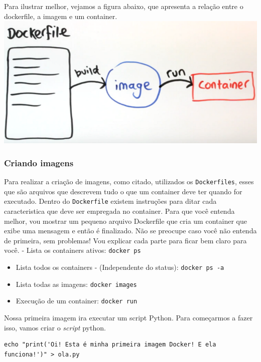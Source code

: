 \documentclass[]{article}
\begin{document}
Para ilustrar melhor, vejamos a figura abaixo, que apresenta a relação entre o dockerfile, a imagem e um container.
\includegraphics{res/docker_file_image_container.png}

\hypertarget{criando-imagens}{%
\subsubsection{Criando imagens}\label{criando-imagens}}

Para realizar a criação de imagens, como citado, utilizados os \texttt{Dockerfiles}, esses que são arquivos que descrevem tudo o que um container deve ter quando for executado. Dentro do \texttt{Dockerfile} existem instruções para ditar cada caracteristica que deve ser empregada no container. Para que você entenda melhor, vou mostrar um pequeno arquivo Dockerfile que cria um container que exibe uma mensagem e então é finalizado. Não se preocupe caso você não entenda de primeira, sem problemas! Vou explicar cada parte para ficar bem claro para você.
- Lista os containers ativos: \texttt{docker\ ps}

\begin{itemize}
\item
  Lista todos os containers - (Independente do status): \texttt{docker\ ps\ -a}
\item
  Lista todas as imagens: \texttt{docker\ images}
\item
  Execução de um container: \texttt{docker\ run}
\end{itemize}

Nossa primeira imagem ira executar um script Python. Para começarmos a fazer isso, vamos criar o \emph{script} python.

\begin{verbatim}
echo "print('Oi! Esta é minha primeira imagem Docker! E ela funciona!')" > ola.py
\end{verbatim}
\end{document}
